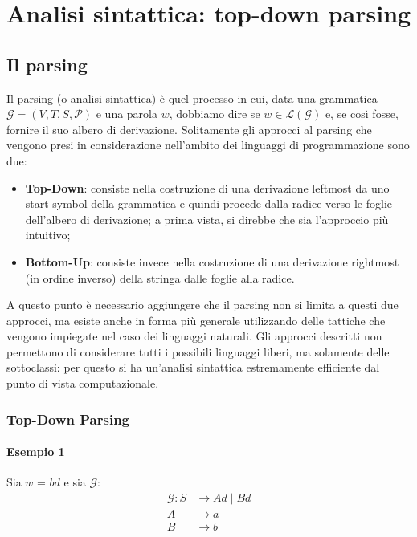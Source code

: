 \documentclass[class=book, crop=false, oneside, 12pt]{standalone}
\begin{document}
\chapter{Analisi sintattica: top-down parsing}

\section{Il parsing}
Il parsing (o analisi sintattica) è quel processo in cui, data una grammatica \(\mathcal{G} = (V, T, S, \mathcal{P})\) e una parola \(w\), dobbiamo dire se \(w \in \mathcal{L(G)}\) e, se così fosse, fornire il suo albero di derivazione. Solitamente gli approcci al parsing che vengono presi in considerazione nell'ambito dei linguaggi di programmazione sono due: 
\begin{itemize}
    \item \textbf{Top-Down}: consiste nella costruzione di una derivazione leftmost da uno start symbol della grammatica e quindi procede dalla radice verso le foglie dell'albero di derivazione; a prima vista, si direbbe che sia l'approccio più intuitivo;
    \item \textbf{Bottom-Up}: consiste invece nella costruzione di una derivazione rightmost (in ordine inverso) della stringa dalle foglie alla radice.
\end{itemize}
A questo punto è necessario aggiungere che il parsing non si limita a questi due approcci, ma esiste anche in forma più generale utilizzando delle tattiche che vengono impiegate nel caso dei linguaggi naturali. Gli approcci descritti non permettono di considerare tutti i possibili linguaggi liberi, ma solamente delle sottoclassi: per questo si ha un'analisi sintattica estremamente efficiente dal punto di vista computazionale.

\subsection{Top-Down Parsing}
\subsubsection{Esempio 1}
Sia \(w\) = \(bd\) e sia \(\mathcal{G}\): 
\begin{align*}
    \mathcal{G}: S &\rightarrow Ad \mid Bd \\
    A &\rightarrow a \\
    B &\rightarrow b
\end{align*}
\end{document}
